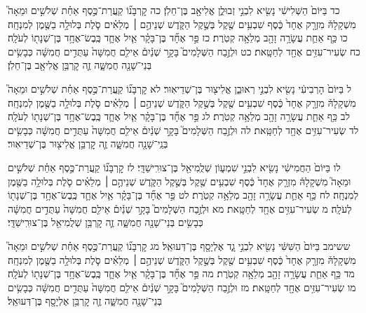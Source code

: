 \documentclass[twoside, openany, parskip=half, 11pt]{book}
\begin{document}
כד בַּיּוֹם֙ הַשְּׁלִישִׁ֔י נָשִׂ֖יא לִבְנֵ֣י זְבוּלֻ֑ן אֱלִיאָ֖ב בֶּן־חֵלֹֽן׃ כה קׇרְבָּנ֞וֹ קַֽעֲרַת־כֶּ֣סֶף אַחַ֗ת שְׁלֹשִׁ֣ים וּמֵאָה֮ מִשְׁקָלָהּ֒ מִזְרָ֤ק אֶחָד֙ כֶּ֔סֶף שִׁבְעִ֥ים שֶׁ֖קֶל בְּשֶׁ֣קֶל הַקֹּ֑דֶשׁ שְׁנֵיהֶ֣ם ׀ מְלֵאִ֗ים סֹ֛לֶת בְּלוּלָ֥ה בַשֶּׁ֖מֶן לְמִנְחָֽה׃ כו כַּ֥ף אַחַ֛ת עֲשָׂרָ֥ה זָהָ֖ב מְלֵאָ֥ה קְטֹֽרֶת׃ כז פַּ֣ר אֶחָ֞ד בֶּן־בָּקָ֗ר אַ֧יִל אֶחָ֛ד כֶּֽבֶשׂ־אֶחָ֥ד בֶּן־שְׁנָת֖וֹ לְעֹלָֽה׃ כח שְׂעִיר־עִזִּ֥ים אֶחָ֖ד לְחַטָּֽאת׃ כט וּלְזֶ֣בַח הַשְּׁלָמִים֮ בָּקָ֣ר שְׁנַ֒יִם֒ אֵילִ֤ם חֲמִשָּׁה֙ עַתֻּדִ֣ים חֲמִשָּׁ֔ה כְּבָשִׂ֥ים בְּנֵי־שָׁנָ֖ה חֲמִשָּׁ֑ה זֶ֛ה קׇרְבַּ֥ן אֱלִיאָ֖ב בֶּן־חֵלֹֽן׃

ל בַּיּוֹם֙ הָרְבִיעִ֔י נָשִׂ֖יא לִבְנֵ֣י רְאוּבֵ֑ן אֱלִיצ֖וּר בֶּן־שְׁדֵיאֽוּר׃ לא קׇרְבָּנ֞וֹ קַֽעֲרַת־כֶּ֣סֶף אַחַ֗ת שְׁלֹשִׁ֣ים וּמֵאָה֮ מִשְׁקָלָהּ֒ מִזְרָ֤ק אֶחָד֙ כֶּ֔סֶף שִׁבְעִ֥ים שֶׁ֖קֶל בְּשֶׁ֣קֶל הַקֹּ֑דֶשׁ שְׁנֵיהֶ֣ם ׀ מְלֵאִ֗ים סֹ֛לֶת בְּלוּלָ֥ה בַשֶּׁ֖מֶן לְמִנְחָֽה׃ לב כַּ֥ף אַחַ֛ת עֲשָׂרָ֥ה זָהָ֖ב מְלֵאָ֥ה קְטֹֽרֶת׃ לג פַּ֣ר אֶחָ֞ד בֶּן־בָּקָ֗ר אַ֧יִל אֶחָ֛ד כֶּֽבֶשׂ־אֶחָ֥ד בֶּן־שְׁנָת֖וֹ לְעֹלָֽה׃ לד שְׂעִיר־עִזִּ֥ים אֶחָ֖ד לְחַטָּֽאת׃ לה וּלְזֶ֣בַח הַשְּׁלָמִים֮ בָּקָ֣ר שְׁנַ֒יִם֒ אֵילִ֤ם חֲמִשָּׁה֙ עַתֻּדִ֣ים חֲמִשָּׁ֔ה כְּבָשִׂ֥ים בְּנֵֽי־שָׁנָ֖ה חֲמִשָּׁ֑ה זֶ֛ה קׇרְבַּ֥ן אֱלִיצ֖וּר בֶּן־שְׁדֵיאֽוּר׃

לו בַּיּוֹם֙ הַחֲמִישִׁ֔י נָשִׂ֖יא לִבְנֵ֣י שִׁמְע֑וֹן שְׁלֻֽמִיאֵ֖ל בֶּן־צוּרִֽישַׁדָּֽי׃ לז קׇרְבָּנ֞וֹ קַֽעֲרַת־כֶּ֣סֶף אַחַ֗ת שְׁלֹשִׁ֣ים וּמֵאָה֮ מִשְׁקָלָהּ֒ מִזְרָ֤ק אֶחָד֙ כֶּ֔סֶף שִׁבְעִ֥ים שֶׁ֖קֶל בְּשֶׁ֣קֶל הַקֹּ֑דֶשׁ שְׁנֵיהֶ֣ם ׀ מְלֵאִ֗ים סֹ֛לֶת בְּלוּלָ֥ה בַשֶּׁ֖מֶן לְמִנְחָֽה׃ לח כַּ֥ף אַחַ֛ת עֲשָׂרָ֥ה זָהָ֖ב מְלֵאָ֥ה קְטֹֽרֶת׃ לט פַּ֣ר אֶחָ֞ד בֶּן־בָּקָ֗ר אַ֧יִל אֶחָ֛ד כֶּֽבֶשׂ־אֶחָ֥ד בֶּן־שְׁנָת֖וֹ לְעֹלָֽה׃ מ שְׂעִיר־עִזִּ֥ים אֶחָ֖ד לְחַטָּֽאת׃ מא וּלְזֶ֣בַח הַשְּׁלָמִים֮ בָּקָ֣ר שְׁנַ֒יִם֒ אֵילִ֤ם חֲמִשָּׁה֙ עַתֻּדִ֣ים חֲמִשָּׁ֔ה כְּבָשִׂ֥ים בְּנֵי־שָׁנָ֖ה חֲמִשָּׁ֑ה זֶ֛ה קׇרְבַּ֥ן שְׁלֻמִיאֵ֖ל בֶּן־צוּרִֽישַׁדָּֽי׃

ששימב בַּיּוֹם֙ הַשִּׁשִּׁ֔י נָשִׂ֖יא לִבְנֵ֣י גָ֑ד אֶלְיָסָ֖ף בֶּן־דְּעוּאֵֽל׃ מג קׇרְבָּנ֞וֹ קַֽעֲרַת־כֶּ֣סֶף אַחַ֗ת שְׁלֹשִׁ֣ים וּמֵאָה֮ מִשְׁקָלָהּ֒ מִזְרָ֤ק אֶחָד֙ כֶּ֔סֶף שִׁבְעִ֥ים שֶׁ֖קֶל בְּשֶׁ֣קֶל הַקֹּ֑דֶשׁ שְׁנֵיהֶ֣ם ׀ מְלֵאִ֗ים סֹ֛לֶת בְּלוּלָ֥ה בַשֶּׁ֖מֶן לְמִנְחָֽה׃ מד כַּ֥ף אַחַ֛ת עֲשָׂרָ֥ה זָהָ֖ב מְלֵאָ֥ה קְטֹֽרֶת׃ מה פַּ֣ר אֶחָ֞ד בֶּן־בָּקָ֗ר אַ֧יִל אֶחָ֛ד כֶּֽבֶשׂ־אֶחָ֥ד בֶּן־שְׁנָת֖וֹ לְעֹלָֽה׃ מו שְׂעִיר־עִזִּ֥ים אֶחָ֖ד לְחַטָּֽאת׃ מז וּלְזֶ֣בַח הַשְּׁלָמִים֮ בָּקָ֣ר שְׁנַ֒יִם֒ אֵילִ֤ם חֲמִשָּׁה֙ עַתֻּדִ֣ים חֲמִשָּׁ֔ה כְּבָשִׂ֥ים בְּנֵי־שָׁנָ֖ה חֲמִשָּׁ֑ה זֶ֛ה קׇרְבַּ֥ן אֶלְיָסָ֖ף בֶּן־דְּעוּאֵֽל׃
\end{document}
